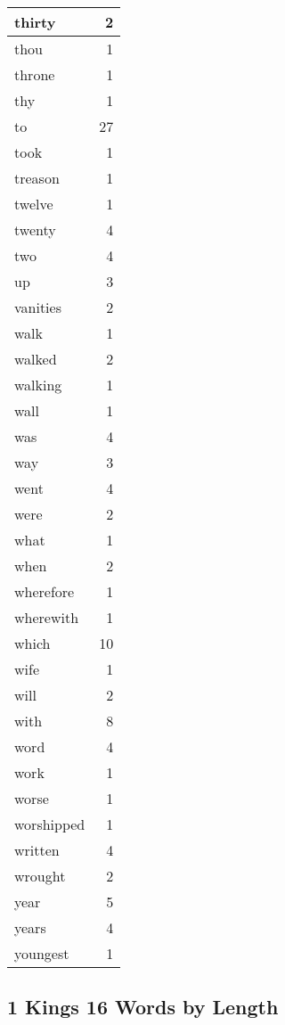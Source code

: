 \begin{center}
\begin{longtable}{l|r}
thirty & 2\\ \hline 
thou & 1\\ \hline 
throne & 1\\ \hline 
thy & 1\\ \hline 
to & 27\\ \hline 
took & 1\\ \hline 
treason & 1\\ \hline 
twelve & 1\\ \hline 
twenty & 4\\ \hline 
two & 4\\ \hline 
up & 3\\ \hline 
vanities & 2\\ \hline 
walk & 1\\ \hline 
walked & 2\\ \hline 
walking & 1\\ \hline 
wall & 1\\ \hline 
was & 4\\ \hline 
way & 3\\ \hline 
went & 4\\ \hline 
were & 2\\ \hline 
what & 1\\ \hline 
when & 2\\ \hline 
wherefore & 1\\ \hline 
wherewith & 1\\ \hline 
which & 10\\ \hline 
wife & 1\\ \hline 
will & 2\\ \hline 
with & 8\\ \hline 
word & 4\\ \hline 
work & 1\\ \hline 
worse & 1\\ \hline 
worshipped & 1\\ \hline 
written & 4\\ \hline 
wrought & 2\\ \hline 
year & 5\\ \hline 
years & 4\\ \hline 
youngest & 1\\ \hline 
\end{longtable}
\end{center}





\subsection{1 Kings 16 Words by Length}


